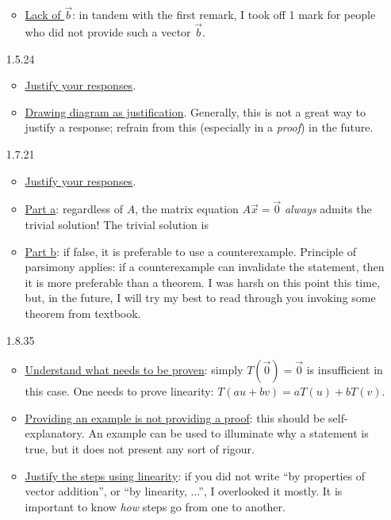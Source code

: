 \documentclass{amsart}
\theoremstyle{definition}
\theoremstyle{definition}
\DeclareMathOperator{\1}{\mathbbm{1}}
\begin{document}
\begin{enumerate}[itemsep = 1.5mm]
\begin{itemize}
		\item \uline{Lack of $\vec{b}$}: in tandem with the first remark, I took off 1 mark for people who did not provide such a vector $\vec{b}$.
	\end{itemize}
	
	
	\item[1.5.24] \begin{itemize}
		\item \uline{Justify your responses}.
		
		\item \uline{Drawing diagram as justification}. Generally, this is not a great way to justify a response; refrain from this (especially in a \textit{proof}) in the future.
	\end{itemize}
	
	
	
	\item[1.7.21] \begin{itemize}
		\item \uline{Justify your responses}.
		
		\item \uline{Part a}: regardless of $A$, the matrix equation $A \vec{x} = \vec{0}$ \textit{always} admits the trivial solution! The trivial solution is 
		
		\item \uline{Part b}: if false, it is preferable to use a counterexample. Principle of parsimony applies: if a counterexample can invalidate the statement, then it is more preferable than a theorem. I was harsh on this point this time, but, in the future, I will try my best to read through you invoking some theorem from textbook.
	\end{itemize}
	
	
	
	\item[1.8.35] \begin{itemize}
		\item \uline{Understand what needs to be proven}: simply $T(\vec{0}) = \vec{0}$ is insufficient in this case. One needs to prove linearity: $T(au + bv) = a T(u) + b T(v)$.
		
		\item \uline{Providing an example is not providing a proof}: this should be self-explanatory. An example can be used to illuminate why a statement is true, but it does not present any sort of rigour.
		
		\item \uline{Justify the steps using linearity}: if you did not write ``by properties of vector addition'', or ``by linearity, ...'', I overlooked it mostly. It is important to know \textit{how} steps go from one to another.
		

\end{itemize}
\end{enumerate}
\end{document}
